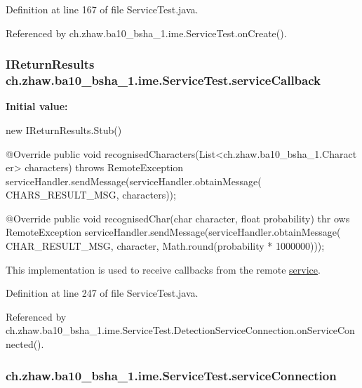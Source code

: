 Definition at line 167 of file ServiceTest.java.

Referenced by ch.zhaw.ba10\_\-bsha\_\-1.ime.ServiceTest.onCreate().\hypertarget{classch_1_1zhaw_1_1ba10__bsha__1_1_1ime_1_1ServiceTest_a1f4c0d2cd1ee8a21b0864daf0a0ef6c9}{
\subsubsection[{serviceCallback}]{\setlength{\rightskip}{0pt plus 5cm}IReturnResults {\bf ch.zhaw.ba10\_\-bsha\_\-1.ime.ServiceTest.serviceCallback}}}
\label{classch_1_1zhaw_1_1ba10__bsha__1_1_1ime_1_1ServiceTest_a1f4c0d2cd1ee8a21b0864daf0a0ef6c9}
{\bfseries Initial value:}
\begin{DoxyCode}
 new IReturnResults.Stub() {
        
                @Override
                public void recognisedCharacters(List<ch.zhaw.ba10_bsha_1.Charact
      er> characters) throws RemoteException {
                        serviceHandler.sendMessage(serviceHandler.obtainMessage(
      CHARS_RESULT_MSG, characters));
                }

                @Override
                public void recognisedChar(char character, float probability) thr
      ows RemoteException {
                        serviceHandler.sendMessage(serviceHandler.obtainMessage(
      CHAR_RESULT_MSG, character, Math.round(probability * 1000000)));
                }
    }
\end{DoxyCode}
This implementation is used to receive callbacks from the remote \hyperlink{namespacech_1_1zhaw_1_1ba10__bsha__1_1_1service}{service}. 

Definition at line 247 of file ServiceTest.java.

Referenced by ch.zhaw.ba10\_\-bsha\_\-1.ime.ServiceTest.DetectionServiceConnection.onServiceConnected().\hypertarget{classch_1_1zhaw_1_1ba10__bsha__1_1_1ime_1_1ServiceTest_ac2a420e14076a26d93ed433d75633b12}{
\subsubsection[{serviceConnection}]{ {\bf ch.zhaw.ba10\_\-bsha\_\-1.ime.ServiceTest.serviceConnection}}}
\label{classch_1_1zhaw_1_1ba10__bsha__1_1_1ime_1_1ServiceTest_ac2a420e14076a26d93ed433d75633b12}


